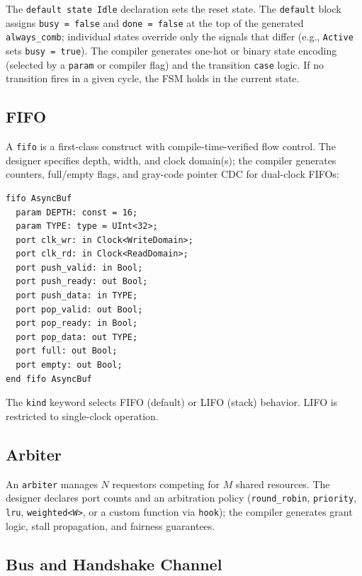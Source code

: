 \documentclass[11pt,twocolumn]{article}
\begin{document}
The \texttt{default state Idle} declaration sets the reset state. The \texttt{default} block assigns \texttt{busy = false} and \texttt{done = false} at the top of the generated \texttt{always\_comb}; individual states override only the signals that differ (e.g., \texttt{Active} sets \texttt{busy = true}). The compiler generates one-hot or binary state encoding (selected by a \texttt{param} or compiler flag) and the transition \texttt{case} logic. If no transition fires in a given cycle, the FSM holds in the current state.

\subsection{FIFO}

A \texttt{fifo} is a first-class construct with compile-time-verified flow control. The designer specifies depth, width, and clock domain(s); the compiler generates counters, full/empty flags, and gray-code pointer CDC for dual-clock FIFOs:

\begin{lstlisting}[language=Arch,caption={Dual-clock FIFO},label={lst:fifo}]
fifo AsyncBuf
  param DEPTH: const = 16;
  param TYPE: type = UInt<32>;
  port clk_wr: in Clock<WriteDomain>;
  port clk_rd: in Clock<ReadDomain>;
  port push_valid: in Bool;
  port push_ready: out Bool;
  port push_data: in TYPE;
  port pop_valid: out Bool;
  port pop_ready: in Bool;
  port pop_data: out TYPE;
  port full: out Bool;
  port empty: out Bool;
end fifo AsyncBuf
\end{lstlisting}

The \texttt{kind} keyword selects FIFO (default) or LIFO (stack) behavior. LIFO is restricted to single-clock operation.

\subsection{Arbiter}

An \texttt{arbiter} manages $N$ requestors competing for $M$ shared resources. The designer declares port counts and an arbitration policy (\texttt{round\_robin}, \texttt{priority}, \texttt{lru}, \texttt{weighted<W>}, or a custom function via \texttt{hook}); the compiler generates grant logic, stall propagation, and fairness guarantees.

\subsection{Bus and Handshake Channel}\label{sec:bus}
\end{document}
